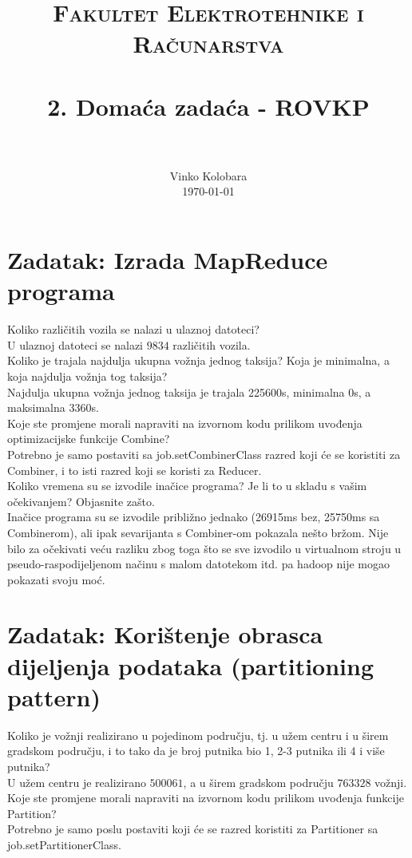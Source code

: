 \documentclass[paper=a4, fontsize=11pt]{scrartcl}
\title{
		\usefont{OT1}{bch}{b}{n}
		\normalfont \normalsize \textsc{Fakultet Elektrotehnike i Računarstva} \\ [25pt]
		\horrule{0.5pt} \\[0.4cm]
		\huge 2. Domaća zadaća - ROVKP \\
		\horrule{2pt} \\[0.5cm]
}
\author{
		\normalfont 								\normalsize
        Vinko Kolobara\\[-3pt]		\normalsize
        \today
}
\date{}
\numberwithin{equation}{section}		%
\numberwithin{figure}{section}			%
\numberwithin{table}{section}				%
\begin{document}
\maketitle

\section{Zadatak: Izrada MapReduce programa}
Koliko različitih vozila se nalazi u ulaznoj datoteci?\\
U ulaznoj datoteci se nalazi $9834$ različitih vozila.\\

Koliko je trajala najdulja ukupna vožnja jednog taksija? Koja je minimalna, a koja najdulja vožnja tog taksija?\\
Najdulja ukupna vožnja jednog taksija je trajala 225600s, minimalna 0s, a maksimalna 3360s.\\

Koje ste promjene morali napraviti na izvornom kodu prilikom uvođenja optimizacijske funkcije Combine?\\
Potrebno je samo postaviti sa job.setCombinerClass razred koji će se koristiti za Combiner, i to isti razred koji se koristi za Reducer.\\

Koliko vremena su se izvodile inačice programa? Je li to u skladu s vašim očekivanjem? Objasnite zašto.\\

Inačice programa su se izvodile približno jednako (26915ms bez, 25750ms sa Combinerom), ali ipak sevarijanta s Combiner-om pokazala nešto bržom. Nije bilo za očekivati veću razliku zbog toga što se sve izvodilo u virtualnom stroju u pseudo-raspodijeljenom načinu s malom datotekom itd. pa hadoop nije mogao pokazati svoju moć.

\pagebreak

\section{Zadatak: Korištenje obrasca dijeljenja podataka (partitioning pattern)}
Koliko je vožnji realizirano u pojedinom području, tj. u užem centru i u širem gradskom području, i to tako da je broj putnika bio 1, 2-3 putnika ili 4 i više putnika?\\
U užem centru je realizirano $500061$, a u širem gradskom području $763328$ vožnji.\\

Koje ste promjene morali napraviti na izvornom kodu prilikom uvođenja funkcije Partition?\\
Potrebno je samo poslu postaviti koji će se razred koristiti za Partitioner sa job.setPartitionerClass.\\
\end{document}
